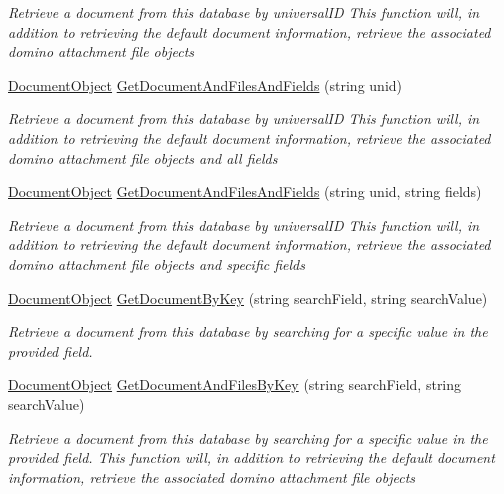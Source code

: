 \begin{DoxyCompactItemize}
\begin{DoxyCompactList}\small\item\em Retrieve a document from this database by universal\+ID This function will, in addition to retrieving the default document information, retrieve the associated domino attachment file objects \end{DoxyCompactList}\item 
\mbox{\hyperlink{class_document_object}{Document\+Object}} \mbox{\hyperlink{class_database_object_a9ad284130fc620b1745bc3fd8db505a5}{Get\+Document\+And\+Files\+And\+Fields}} (string unid)
\begin{DoxyCompactList}\small\item\em Retrieve a document from this database by universal\+ID This function will, in addition to retrieving the default document information, retrieve the associated domino attachment file objects and all fields \end{DoxyCompactList}\item 
\mbox{\hyperlink{class_document_object}{Document\+Object}} \mbox{\hyperlink{class_database_object_a3de8e675278647046b0e48109ab0784f}{Get\+Document\+And\+Files\+And\+Fields}} (string unid, string fields)
\begin{DoxyCompactList}\small\item\em Retrieve a document from this database by universal\+ID This function will, in addition to retrieving the default document information, retrieve the associated domino attachment file objects and specific fields \end{DoxyCompactList}\item 
\mbox{\hyperlink{class_document_object}{Document\+Object}} \mbox{\hyperlink{class_database_object_a57bfc77d2754236cbcf6ac30a90da529}{Get\+Document\+By\+Key}} (string search\+Field, string search\+Value)
\begin{DoxyCompactList}\small\item\em Retrieve a document from this database by searching for a specific value in the provided field. \end{DoxyCompactList}\item 
\mbox{\hyperlink{class_document_object}{Document\+Object}} \mbox{\hyperlink{class_database_object_a30968034c65328e44ddb0fdac8ab1435}{Get\+Document\+And\+Files\+By\+Key}} (string search\+Field, string search\+Value)
\begin{DoxyCompactList}\small\item\em Retrieve a document from this database by searching for a specific value in the provided field. This function will, in addition to retrieving the default document information, retrieve the associated domino attachment file objects \end{DoxyCompactList}\item 

\end{DoxyCompactItemize}
